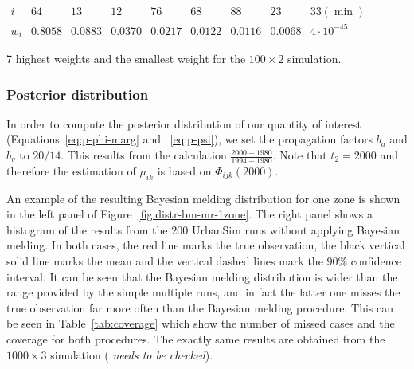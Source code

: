 \documentclass[11pt, fleqn]{article}
\begin{document}
\begin{table}
\begin{center}
$
\begin{array}{c|ccccccc|c}
i & 64 & 13 & 12 & 76 & 68 & 88 & 23 & 33 (\min)\\\hline
w_i & 0.8058 & 0.0883 & 0.0370 & 0.0217 &0.0122 & 0.0116 & 0.0068 & 4\cdot 10^{-45}
\end{array}
$
\caption{\label{tab:weights}\small 7 highest weights and the smallest weight for the $100\times 2$ simulation.}
\end{center}
\end{table}

\subsubsection{Posterior distribution}
%
In order to compute the posterior distribution of our quantity of interest
(Equations~\ref{eq:p-phi-marg} and ~\ref{eq:p-psi}), we set the propagation
factors  $b_a$ and $b_v$ to $20/14$. This results from the calculation
$\frac{2000-1980}{1994-1980}$. Note that $t_2=2000$ and therefore the
estimation of $\mu_{ik}$ is based on $\Phi_{ijk}(2000)$.

An example of the resulting Bayesian melding distribution for one zone is
shown in the left panel of Figure~\ref{fig:distr-bm-mr-1zone}. The right panel
shows a histogram of the results from the $200$ UrbanSim runs without applying
Bayesian melding. In both cases, the red line marks the true observation, the
black vertical solid line marks the mean and the vertical dashed lines mark
the $90\%$ confidence interval.  It can be seen that the Bayesian melding
distribution is wider than the range provided by the simple multiple runs, and
in fact the latter one misses the true observation far more often than the
Bayesian melding procedure. This can be seen in Table~\ref{tab:coverage} which
show the number of missed cases and the coverage for both procedures.  The
exactly same results are obtained from the $1000\times 3$ simulation ({\em
  needs to be checked}).
\end{document}
